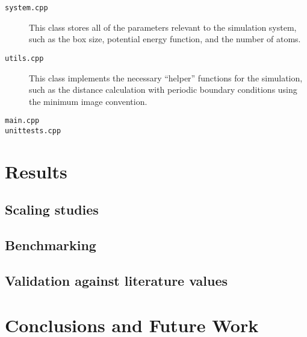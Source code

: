 \documentclass[12pt]{article}
\begin{document}
\begin{description}
\item[\texttt{system.cpp}] This class stores all of the parameters relevant to the simulation system, such as the box size, potential energy function, and the number of atoms. 

\item[\texttt{utils.cpp}] This class implements the necessary ``helper'' functions for the simulation, such as the distance calculation with periodic boundary conditions using the minimum image convention.

\item[\texttt{main.cpp}]

\item[\texttt{unittests.cpp}]

\end{description}
\section{Results}

\subsection{Scaling studies}

\subsection{Benchmarking}

\subsection{Validation against literature values}

\section{Conclusions and Future Work}
\end{document}
